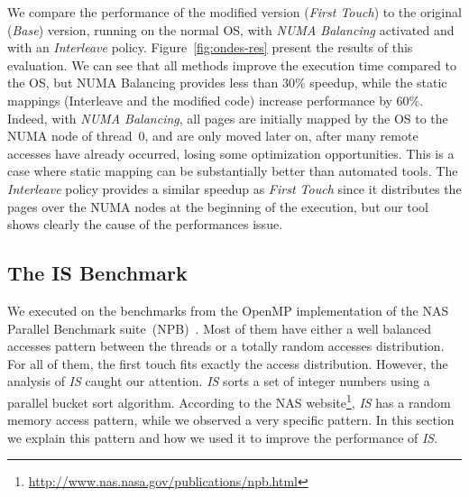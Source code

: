 We compare the performance of the modified version (\emph{First Touch}) to the
original (\emph{Base})
version, running on the normal OS, with \emph{NUMA Balancing} activated and with an
\emph{Interleave} policy. Figure~\ref{fig:ondes-res} present the results of this
evaluation. We can see that all methods improve the execution time compared to the OS, but
NUMA Balancing provides less than $30\%$ speedup, while the static mappings
(Interleave and the modified code) increase performance by $60\%$.
Indeed,
with \emph{NUMA Balancing}, all pages are initially mapped by the OS to the NUMA node
of thread~$0$, and
are only moved later on, after many remote accesses have already occurred,
losing some optimization opportunities. This is a case where static mapping can be substantially better than automated
tools. The \emph{Interleave} policy provides a similar speedup as
\emph{First Touch} since it distributes the pages over the NUMA nodes at the beginning of
the execution, but our tool shows clearly the cause of the performances issue.


\subsection{The IS Benchmark}
\label{sec:exp-is}

We executed \TABARNAC on the benchmarks %
from the OpenMP
implementation of the NAS Parallel Benchmark suite~(NPB)~\cite{Jin1999}.
Most
of them have either a well balanced accesses pattern between the threads or a
totally random accesses distribution. For all of them, the first touch fits exactly
the access distribution. However, the analysis of \emph{IS} caught our attention.
\emph{IS} sorts a set of integer numbers using a parallel bucket sort
algorithm.
According to the NAS
website\footnote{\url{http://www.nas.nasa.gov/publications/npb.html}}, \emph{IS} has a
random memory access pattern, while we observed a very specific pattern. In this
section we explain this pattern and how we used it to improve the performance of \emph{IS}.


